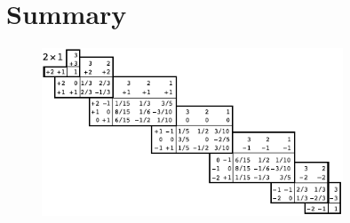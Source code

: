 \section{Summary}
\begin{figure}[b!]
    \centering
    \includegraphics[width=0.8\textwidth]{coefficients-table}
\end{figure}
%
